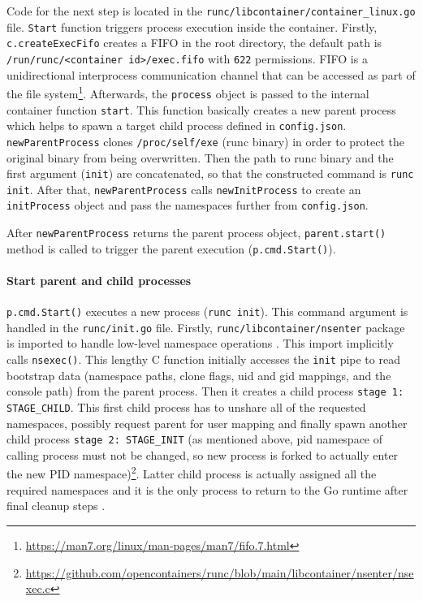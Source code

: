 Code for the next step is located in the \texttt{runc/libcontainer/container\_linux.go} file. \texttt{Start} function triggers process execution inside the container. Firstly, \texttt{c.createExecFifo} creates a FIFO in the root directory, the default path is \texttt{/run/runc/<container id>/exec.fifo} with \texttt{622} permissions. FIFO is a unidirectional interprocess communication channel that can be accessed as part of the file system\footnote{\url{https://man7.org/linux/man-pages/man7/fifo.7.html}}. Afterwards, the \texttt{process} object is passed to the internal container function \texttt{start}. This function basically creates a new parent process which helps to spawn a target child process defined in \texttt{config.json}. \texttt{newParentProcess} clones \texttt{/proc/self/exe} (runc binary) in order to protect the original binary from being overwritten. Then the path to runc binary and the first argument (\texttt{init}) are concatenated, so that the constructed command is \texttt{runc init}. After that, \texttt{newParentProcess} calls \texttt{newInitProcess} to create an \texttt{initProcess} object and pass the namespaces further from \texttt{config.json}.

After \texttt{newParentProcess} returns the parent process object, \texttt{parent.start()} method is called to trigger the parent execution (\texttt{p.cmd.Start()}).

\paragraph*{Start parent and child processes}

\texttt{p.cmd.Start()} executes a new process (\texttt{runc init}). This command argument is handled in the \texttt{runc/init.go} file. Firstly, \linebreak \texttt{runc/libcontainer/nsenter} package is imported to handle low-level namespace operations \cite{sof:1}. This import implicitly calls \texttt{nsexec()}. This lengthy C function initially accesses the \texttt{init} pipe to read bootstrap data (namespace paths, clone flags, uid and gid mappings, and the console path) from the parent process. Then it creates a child process \texttt{stage 1: STAGE\_CHILD}. This first child process has to unshare all of the requested namespaces, possibly request parent for user mapping and finally spawn another child process \texttt{stage 2: STAGE\_INIT} (as mentioned above, pid namespace of calling process must not be changed, so new process is forked to actually enter the new PID namespace)\footnote{\url{https://github.com/opencontainers/runc/blob/main/libcontainer/nsenter/nsexec.c}}. Latter child process is actually assigned all the required namespaces and it is the only process to return to the Go runtime after final cleanup steps \cite{b:terenceli}.

